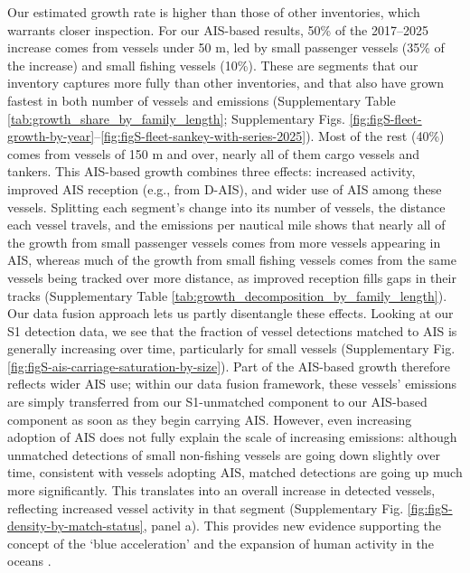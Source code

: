 \documentclass[lineno,pdflatex,sn-nature]{sn-jnl}
\begin{document}
Our estimated growth rate is higher than those of other inventories, which warrants closer inspection. For our AIS-based results, 50\% of the 2017--2025 increase comes from vessels under 50 m, led by small passenger vessels (35\% of the increase) and small fishing vessels (10\%). These are segments that our inventory captures more fully than other inventories, and that also have grown fastest in both number of vessels and emissions (Supplementary Table \ref{tab:growth_share_by_family_length}; Supplementary Figs. \ref{fig:figS-fleet-growth-by-year}--\ref{fig:figS-fleet-sankey-with-series-2025}). Most of the rest (40\%) comes from vessels of 150 m and over, nearly all of them cargo vessels and tankers. This AIS-based growth combines three effects: increased activity, improved AIS reception (e.g., from D-AIS), and wider use of AIS among these vessels. Splitting each segment's change into its number of vessels, the distance each vessel travels, and the emissions per nautical mile shows that nearly all of the growth from small passenger vessels comes from more vessels appearing in AIS, whereas much of the growth from small fishing vessels comes from the same vessels being tracked over more distance, as improved reception fills gaps in their tracks (Supplementary Table \ref{tab:growth_decomposition_by_family_length}). Our data fusion approach lets us partly disentangle these effects. Looking at our S1 detection data, we see that the fraction of vessel detections matched to AIS is generally increasing over time, particularly for small vessels (Supplementary Fig. \ref{fig:figS-ais-carriage-saturation-by-size}). Part of the AIS-based growth therefore reflects wider AIS use; within our data fusion framework, these vessels' emissions are simply transferred from our S1-unmatched component to our AIS-based component as soon as they begin carrying AIS. However, even increasing adoption of AIS does not fully explain the scale of increasing emissions: although unmatched detections of small non-fishing vessels are going down slightly over time, consistent with vessels adopting AIS, matched detections are going up much more significantly. This translates into an overall increase in detected vessels, reflecting increased vessel activity in that segment (Supplementary Fig. \ref{fig:figS-density-by-match-status}, panel a). This provides new evidence supporting the concept of the `blue acceleration' and the expansion of human activity in the oceans \cite{jouffray2020blue}. 
\end{document}
